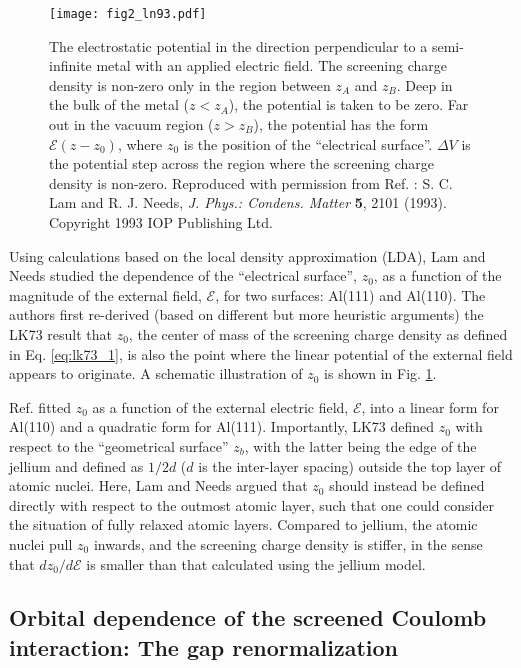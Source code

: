 \documentclass[aip, amsmath, amssymb, reprint, longbibliography]{revtex4-2}
\begin{document}
\begin{figure}[htp]
\centering
\texttt{[image: fig2\_ln93.pdf]}
\caption{The electrostatic potential in the direction perpendicular to a semi-infinite metal with an applied electric field. The screening charge density is non-zero only in the region between $z_A$ and $z_B$. Deep in the bulk of the metal ($z<z_A$), the potential is taken to be zero. Far out in the vacuum region ($z>z_B$), the potential has the form $\mathcal{E}(z-z_0)$, where $z_0$ is the position of the ``electrical surface''. $\Delta V$ is the potential step across the region where the screening charge density is non-zero. Reproduced with
permission from Ref. : S. C. Lam and R. J. Needs, \emph{J. Phys.: Condens. Matter} \textbf{5}, 2101 (1993). Copyright 1993 IOP Publishing Ltd.}
\label{fig:ln93}
\end{figure}

Using calculations based on the local density approximation (LDA), Lam and Needs \cite{LN93} studied the dependence of the ``electrical surface'', $z_0$, as a function of the magnitude of the external field, $\mathcal{E}$, for two surfaces: Al(111) and Al(110). The authors first re-derived (based on different but more heuristic arguments) the LK73 result that $z_0$, the center of mass of the screening charge density as defined in Eq. \eqref{eq:lk73_1}, is also the point where the linear potential of the external field appears to originate. A schematic illustration of $z_0$ is shown in Fig. \ref{fig:ln93}.

Ref.  fitted $z_0$ as a function of the external electric field, $\mathcal{E}$, into a linear form for Al(110) and a quadratic form for Al(111). Importantly, LK73 defined $z_0$ with respect to the ``geometrical surface'' $z_b$, with the latter being the edge of the jellium and defined as $1/2d$ ($d$ is the inter-layer spacing) outside the top layer of atomic nuclei. Here, Lam and Needs argued that $z_0$ should instead be defined directly with respect to the outmost atomic layer, such that one could consider the situation of fully relaxed atomic layers. Compared to jellium, the atomic nuclei pull $z_0$ inwards, and the screening charge density is stiffer, in the sense that $dz_0/d\mathcal{E}$ is smaller than that calculated using the jellium model.

\subsection{Orbital dependence of the screened Coulomb interaction: The gap renormalization}
\label{sec:renorm}
\end{document}
